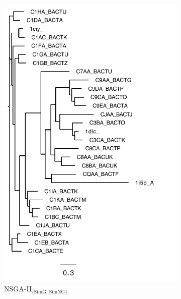 \begin{figure}[!h]
\begin{adjustwidth}{-1cm}{-1cm}
\begin{subfigure}[b]{0.25\textwidth}
			\includegraphics[width=\columnwidth]{Figure/tree/BB20010_simg_tree}
			\caption{NSGA-II$_{\text{\{SimG, SimNG\}}}$}
\end{subfigure}
		\begin{subfigure}[b]{0.25\textwidth}

\end{subfigure}
\end{adjustwidth}
\end{figure}
